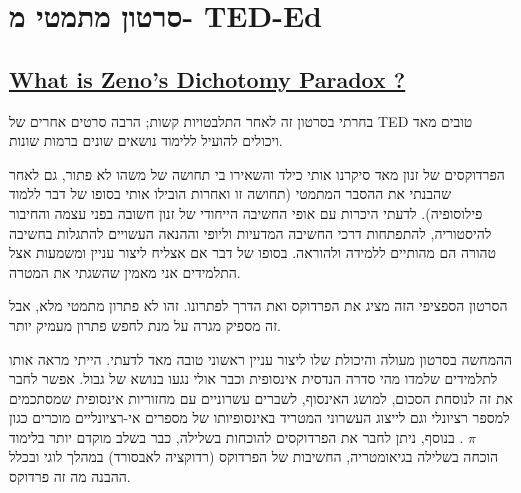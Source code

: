 
\section{סרטון מתמטי מ- TED-Ed}

\hypersetup{urlcolor=blue}
\label{https://ed.ted.com/lessons/what-is-zeno-s-dichotomy-paradox-colm-kelleher}
\subsection*{%
\href{https://ed.ted.com/lessons/what-is-zeno-s-dichotomy-paradox-colm-kelleher}{\textbf{What is Zeno’s Dichotomy Paradox ?}}%
}

בחרתי בסרטון זה לאחר התלבטויות קשות; הרבה סרטים אחרים של TED טובים מאד ויכולים להועיל ללימוד נושאים שונים ברמות שונות.

הפרדוקסים של זנון מאד סיקרנו אותי כילד והשאירו בי תחושה של משהו לא פתור, גם לאחר %
שהבנתי את ההסבר המתמטי (תחושה זו ואחרות הובילו אותי בסופו של דבר ללמוד פילוסופיה). %
לדעתי היכרות עם אופי החשיבה הייחודי של זנון חשובה בפני עצמה והחיבור להיסטוריה, %
להתפתחות דרכי החשיבה המדעיות וליופי וההנאה העשויים להתגלות בחשיבה טהורה הם מהותיים %
ללמידה ולהוראה. בסופו של דבר אם אצליח ליצור עניין ומשמעות אצל התלמידים אני מאמין שהשגתי את המטרה.

הסרטון הספציפי הזה מציג את הפרדוקס ואת הדרך לפתרונו. זהו לא פתרון מתמטי מלא, %
אבל זה מספיק מגרה על מנת לחפש פתרון מעמיק יותר.

ההמחשה בסרטון מעולה והיכולת שלו ליצור עניין ראשוני טובה מאד לדעתי. הייתי מראה אותו לתלמידים %
שלמדו מהי סדרה הנדסית אינסופית וכבר אולי נגעו בנושא של גבול. אפשר לחבר את זה לנוסחת %
הסכום, למושג האינסוף, לשברים עשרוניים עם מחזוריות אינסופית שמסתכמים למספר רציונלי %
וגם לייצוג העשרוני המטריד באינסופיותו של מספרים אי-רציונליים מוכרים כגון %
$\pi$ %
. בנוסף, ניתן לחבר את הפרדוקסים להוכחות בשלילה, כבר בשלב מוקדם יותר בלימוד הוכחה %
 בשלילה בגיאומטריה, החשיבות של הפרדוקס (רדוקציה לאבסורד) במהלך לוגי ובכלל %
ההבנה מה זה פרדוקס.


